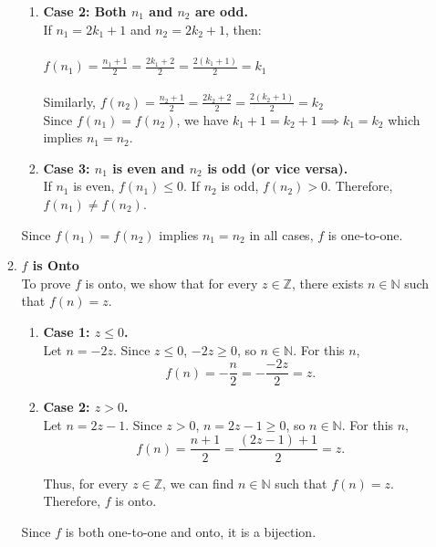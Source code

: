 \documentclass[11pt]{article}
\begin{document}
\begin{enumerate}
\begin{enumerate}
\begin{enumerate}
\item \textbf{Case 2: Both $ n_1 $ and $ n_2 $ are odd.} \\
If $ n_1 = 2k_1 + 1 $ and $ n_2 = 2k_2 + 1 $, then: \\
\\
$f(n_1) = \frac{n_1+1}{2} = \frac{2k_1+2}{2} = \frac{2(k_1+1)}{2} = k_1$ \\
\\
Similarly, $f(n_2) = \frac{n_2+1}{2} = \frac{2k_2+2}{2} = \frac{2(k_2+1)}{2} = k_2$ \\

Since $ f(n_1) = f(n_2) $, we have $k_1 + 1 = k_2 + 1 \implies k_1 = k_2$
which implies $ n_1 = n_2 $. \\

\item \textbf{Case 3: $ n_1 $ is even and $ n_2 $ is odd (or vice versa).} \\
If $ n_1 $ is even, $ f(n_1) \leq 0 $.  
If $ n_2 $ is odd, $ f(n_2) > 0 $.  
Therefore, $ f(n_1) \neq f(n_2) $.
\end{enumerate}

Since $ f(n_1) = f(n_2) $ implies $ n_1 = n_2 $ in all cases, $ f $ is one-to-one.
\\
\item \textbf{$ f $ is Onto} \\
To prove $ f $ is onto, we show that for every $ z \in \mathbb{Z} $, there exists $ n \in \mathbb{N} $ such that $ f(n) = z $.
\begin{enumerate}
    \item \textbf{Case 1: $ z \leq 0 $.} \\
Let $ n = -2z $. Since $ z \leq 0 $, $ -2z \geq 0 $, so $ n \in \mathbb{N} $.  
For this $ n $,
\[
f(n) = -\frac{n}{2} = -\frac{-2z}{2} = z.
\]

\item \textbf{Case 2: $ z > 0 $.} \\
Let $ n = 2z - 1 $. Since $ z > 0 $, $ n = 2z - 1 \geq 0 $, so $ n \in \mathbb{N} $.  
For this $ n $,
\[
f(n) = \frac{n+1}{2} = \frac{(2z - 1) + 1}{2} = z.
\]

Thus, for every $ z \in \mathbb{Z} $, we can find $ n \in \mathbb{N} $ such that $ f(n) = z $. Therefore, $ f $ is onto.
\end{enumerate}

Since $ f $ is both one-to-one and onto, it is a bijection.

\end{enumerate}
\pagebreak


\end{enumerate}
\end{document}

